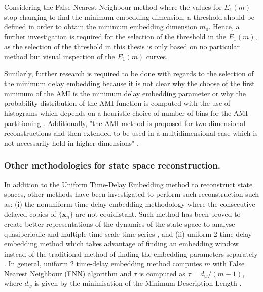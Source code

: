 Considering the False Nearest Neighbour method \citep{Cao1997} where 
the values for $E_1(m)$ stop changing to find the minimum embedding 
dimension, a threshold should be defined in order to obtain the minimum 
embedding dimension $m_0$. Hence, a further investigation is required 
for the selection of the threshold in the $E_1(m)$, as the selection 
of the threshold in this thesis is only based on no particular method 
but visual inspection of the $E_1(m)$ curves.




Similarly, further research is required to be done with regards to the 
selection of the minimum delay embedding because it is not clear 
why the choose of the first minimum of the AMI is the minimum delay 
embedding parameter 
\citep{kantz2003} or why the probability distribution of the AMI function 
is computed with the use of histograms which depends on a heuristic 
choice of number of bins for the AMI partitioning \citep{garcia2005e71}. 
Additionally, "the AMI method is proposed for two dimensional 
reconstructions and then extended to be used in a multidimensional case 
which is not necessarily hold in higher dimensions" 
\citep[p. 156]{gomezgarcia2014}.


\subsubsection{Other methodologies for state space reconstruction.}
In addition to the Uniform Time-Delay Embedding method to reconstruct
state spaces, other methods have been investigated to perform such 
reconstruction such as:
(i) the nonuniform time-delay embedding methodology  
where the consecutive delayed copies of $\{ \boldsymbol{x}_n  \} $ are not
equidistant. Such method has been proved to create better representations 
of the dynamics of the state space to analyse quasiperiodic 
and multiple time-scale time series 
\citep{pecora2007, uzal2011, 
Quintana-Duque2012, Quintana-Duque2013, Quintana-Duque2016}, and
(ii) uniform 2 time-delay embedding method which takes advantage 
of finding an embedding window instead of the traditional method 
of finding the embedding parameters separately \citep{gomezgarcia2014}.
In general, uniform 2 time-delay embedding method computes $m$ with 
False Nearest Neighbour (FNN) algorithm and $\tau$ is computed as 
$\tau= d_w / (m-1)$, where $d_w$ is given by the minimisation of the 
Minimum Description Length \citep{small2004}.

